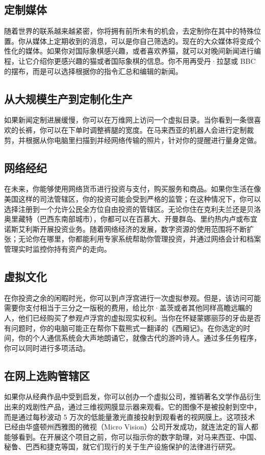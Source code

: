 \subsection{定制媒体}
随着世界的联系越来越紧密，你将拥有前所未有的机会，去定制你在其中的特殊位置。你从媒体上定期收到的消息，可以是你自己筛选的。现在的大众媒体将变成个性化的媒体。如果你对国际象棋感兴趣，或者喜欢养猫，就可以对晚间新闻进行编程，让它介绍你更感兴趣的猫或者国际象棋的信息。你不用再受丹·拉瑟或 BBC 的摆布，而是可以选择根据你的指令汇总和编辑的新闻。

\subsection{从大规模生产到定制化生产}
如果新闻定制进展缓慢，你可以在万维网上访问一个虚拟目录。当你看到一条很喜欢的长裤，你可以在下单时调整裤腿的宽度。在马来西亚的机器人会进行定制裁剪，并根据从你电脑里扫描到并经网络传输的照片，针对你的提醒进行量身定做。

\subsection{网络经纪}
在未来，你能够使用网络货币进行投资与支付，购买服务和商品。如果你生活在像美国这样的司法管辖区，你的投资可能会受到严格的监管；在这种情况下，你可以选择注册到一个允许公民全方位自由投资的管辖区。无论你住在克利夫兰还是贝洛奥里藏特（巴西东南部城市），你都可以在百慕大、开曼群岛、里约热内卢或布宜诺斯艾利斯开展投资业务。随着网络经济的发展，数字资源的使用范围将不断扩张；无论你在哪里，你都能利用专家系统帮助你管理投资，并通过网络会计和档案管理实时监控你持有资产的走向。

\subsection{虚拟文化}
在你投资之余的闲暇时光，你可以到卢浮宫进行一次虚拟参观。但是，该访问可能需要你支付相当于三分之一版税的费用，给比尔·盖茨或者其他同样高瞻远瞩的人，他们已经购买了参观卢浮宫的虚拟现实权利。当你在怀疑蒙娜丽莎的牙齿是否有问题时，你的电脑可能正在帮你下载熊式一翻译的《西厢记》。在你选定的时间，你的个人通信系统会大声地朗诵它，就像古代的游吟诗人。通过多任务程序，你可以同时进行多项活动。

\subsection{在网上选购管辖区}
如果你从经典作品中受到启发，你可以创办一个虚拟公司，推销著名文学作品衍生出来的戏剧性产品，通过三维视网膜显示器来观看。它的图像不是被投射到空中，而是通过每秒波动 5 万次的低能量激光直接投射到观看者的视网膜上。这项技术已经由华盛顿州西雅图的微视（Micro Vision）公司开发成功，就连法定的盲人都能够看到。在开展这个项目之前，你可以指示你的数字助理，对马来西亚、中国、秘鲁、巴西和捷克等国，就它们现行的关于生产设施保护的法律进行研究。

